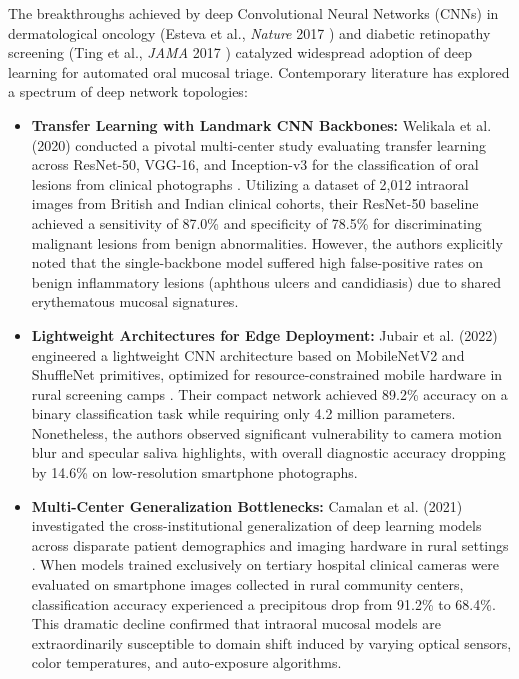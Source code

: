 \documentclass[12pt,a4paper,oneside]{report}
\begin{document}
The breakthroughs achieved by deep Convolutional Neural Networks (CNNs) in dermatological oncology (Esteva et al., \textit{Nature} 2017 \cite{esteva2017dermatologist}) and diabetic retinopathy screening (Ting et al., \textit{JAMA} 2017 \cite{ting2017development}) catalyzed widespread adoption of deep learning for automated oral mucosal triage. Contemporary literature has explored a spectrum of deep network topologies:

\begin{itemize}
    \item \textbf{Transfer Learning with Landmark CNN Backbones:} Welikala et al. (2020) conducted a pivotal multi-center study evaluating transfer learning across ResNet-50, VGG-16, and Inception-v3 for the classification of oral lesions from clinical photographs \cite{welikala2020automated}. Utilizing a dataset of 2,012 intraoral images from British and Indian clinical cohorts, their ResNet-50 baseline achieved a sensitivity of 87.0\% and specificity of 78.5\% for discriminating malignant lesions from benign abnormalities. However, the authors explicitly noted that the single-backbone model suffered high false-positive rates on benign inflammatory lesions (aphthous ulcers and candidiasis) due to shared erythematous mucosal signatures.
    
    \item \textbf{Lightweight Architectures for Edge Deployment:} Jubair et al. (2022) engineered a lightweight CNN architecture based on MobileNetV2 and ShuffleNet primitives, optimized for resource-constrained mobile hardware in rural screening camps \cite{jubair2022lightweight}. Their compact network achieved 89.2\% accuracy on a binary classification task while requiring only 4.2 million parameters. Nonetheless, the authors observed significant vulnerability to camera motion blur and specular saliva highlights, with overall diagnostic accuracy dropping by 14.6\% on low-resolution smartphone photographs.
    
    \item \textbf{Multi-Center Generalization Bottlenecks:} Camalan et al. (2021) investigated the cross-institutional generalization of deep learning models across disparate patient demographics and imaging hardware in rural settings \cite{camalan2021generalization}. When models trained exclusively on tertiary hospital clinical cameras were evaluated on smartphone images collected in rural community centers, classification accuracy experienced a precipitous drop from 91.2\% to 68.4\%. This dramatic decline confirmed that intraoral mucosal models are extraordinarily susceptible to domain shift induced by varying optical sensors, color temperatures, and auto-exposure algorithms.
    

\end{itemize}
\end{document}
